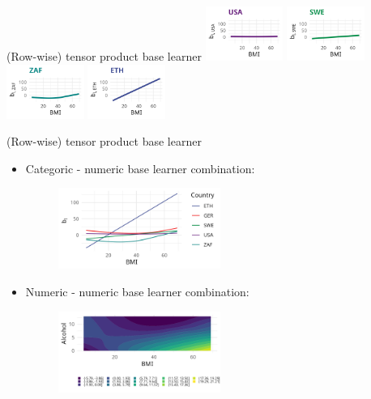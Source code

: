 \documentclass[t,10pt]{beamer}
\begin{document}
\begin{frame}{(Row-wise) tensor product base learner}
  {\includegraphics[width=0.19\textwidth]{figures/bs-tensor/fig-tensor-USA.png}}
  \includegraphics[width=0.19\textwidth]{figures/bs-tensor/fig-tensor-SWE.png}
  {\includegraphics[width=0.19\textwidth]{figures/bs-tensor/fig-tensor-ZAF.png}}
  {\includegraphics[width=0.19\textwidth]{figures/bs-tensor/fig-tensor-ETH.png}}
  \addtocounter{framenumber}{-1}
\end{frame}

\begin{frame}{(Row-wise) tensor product base learner}
  \begin{itemize}
    \item Categoric - numeric base learner combination:
      \begin{figure}
        \centering
        \includegraphics[width=0.5\textwidth]{figures/bs-tensor/fig-cat-num.png}
      \end{figure}
    \item Numeric - numeric base learner combination:
      \begin{figure}
        \centering
        \includegraphics[width=0.5\textwidth]{figures/bs-tensor/fig-num-num.png}
      \end{figure}
  \end{itemize}
\end{frame}
\end{document}
